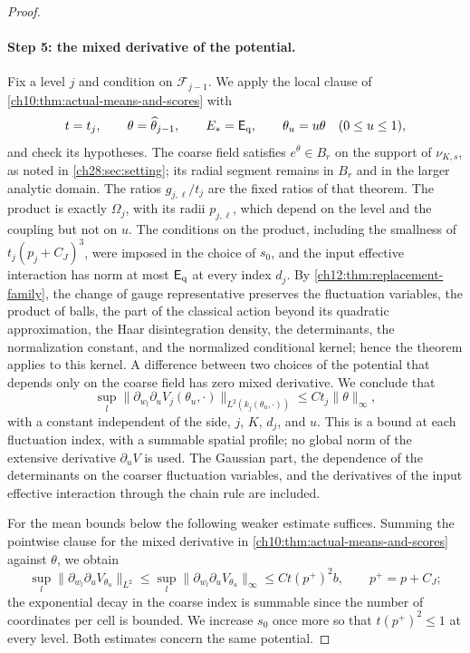 \begin{proof}
\paragraph{Step 5: the mixed derivative of the potential.}
Fix a level $j$ and condition on $\mathcal F_{j-1}$. We apply the local clause of \cref{ch10:thm:actual-means-and-scores} with
\[
 t=t_j,\qquad \theta=\widehat\theta_{j-1},\qquad E_*=\mathsf E_{\rm q},\qquad \theta_u=u\theta\quad(0\le u\le1),
\]
and check its hypotheses. The coarse field satisfies $e^\theta\in B_r$ on the support of $\nu_{K,s}$, as noted in \cref{ch28:sec:setting}; its radial segment remains in $B_r$ and in the larger analytic domain. The ratios $g_{j,\ell}/t_j$ are the fixed ratios of that theorem. The product is exactly $\Omega_j$, with its radii $p_{j,\ell}$, which depend on the level and the coupling but not on $u$. The conditions on the product, including the smallness of $t_j(p_j+C_J)^3$, were imposed in the choice of $s_0$, and the input effective interaction has norm at most $\mathsf E_{\rm q}$ at every index $d_j$. By \cref{ch12:thm:replacement-family}, the change of gauge representative preserves the fluctuation variables, the product of balls, the part of the classical action beyond its quadratic approximation, the Haar disintegration density, the determinants, the normalization constant, and the normalized conditional kernel; hence the theorem applies to this kernel. A difference between two choices of the potential that depends only on the coarse field has zero mixed derivative. We conclude that
\begin{equation}\label{ch28:eq:rooted-score-Ltwo}
 \sup_l\|\partial_{w_l}\partial_uV_j(\theta_u,\cdot)\|_{L^2(k_j(\theta_u,\cdot))}\le Ct_j\|\theta\|_\infty,
\end{equation}
with a constant independent of the side, $j$, $K$, $d_j$, and $u$. This is a bound at each fluctuation index, with a summable spatial profile; no global norm of the extensive derivative $\partial_uV$ is used. The Gaussian part, the dependence of the determinants on the coarser fluctuation variables, and the derivatives of the input effective interaction through the chain rule are included.

For the mean bounds below the following weaker estimate suffices. Summing the pointwise clause for the mixed derivative in \cref{ch10:thm:actual-means-and-scores} against $\theta$, we obtain
\begin{equation}\label{ch28:eq:available-score-bound}
 \sup_l\|\partial_{w_l}\partial_uV_{\theta_u}\|_{L^2}\le\sup_l\|\partial_{w_l}\partial_uV_{\theta_u}\|_\infty\le Ct(p^+)^2b,\qquad p^+=p+C_J;
\end{equation}
the exponential decay in the coarse index is summable since the number of coordinates per cell is bounded. We increase $s_0$ once more so that $t(p^+)^2\le1$ at every level. Both estimates concern the same potential.


\end{proof}
